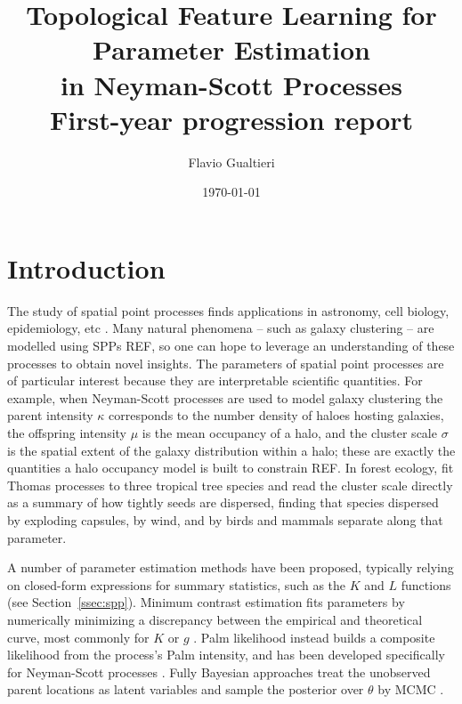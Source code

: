\documentclass[11pt,a4paper]{article}
\title{Topological Feature Learning for Parameter Estimation\\
       in Neyman-Scott Processes\\[4pt]
       \large First-year progression report}
\author{Flavio Gualtieri}
\date{\today}
\theoremstyle{definitioncolon}
\begin{document}
\maketitle



\section{Introduction}
\label{sec:intro}

The study of spatial point processes finds applications in astronomy, cell
biology, epidemiology, etc \citep{moller2004statistical}. Many natural phenomena
-- such as galaxy clustering -- are modelled using SPPs REF, so one can hope to
leverage an understanding of these processes to obtain novel insights. The
parameters of spatial point processes are of particular interest because
they are interpretable scientific quantities.
For example, when Neyman-Scott processes are used to model galaxy clustering the parent intensity $\kappa$ corresponds to the number density of
haloes hosting galaxies, the offspring intensity $\mu$ is the mean occupancy of
a halo, and the cluster scale $\sigma$ is the spatial extent of the galaxy
distribution within a halo; these are exactly the quantities a halo occupancy
model is built to constrain REF. In forest ecology,
\citet{waagepetersen2009twostep} fit Thomas processes to three tropical tree
species and read the cluster scale directly as a summary of how tightly seeds
are dispersed, finding that species dispersed by exploding capsules, by wind,
and by birds and mammals separate along that parameter.

A number of parameter estimation methods have been proposed,
typically relying on closed-form expressions for summary statistics, such as the $K$ and $L$
functions (see Section~\ref{ssec:spp}). Minimum contrast estimation fits
parameters by numerically
minimizing a discrepancy between the empirical and theoretical curve, most
commonly for $K$ or $g$ \citep{diggle2003spatial}. Palm likelihood instead
builds a composite likelihood from the process's Palm intensity, and has been
developed specifically for Neyman-Scott processes \citep{tanaka2008parameter}.
Fully Bayesian approaches treat the unobserved parent locations as latent
variables and sample the posterior over $\theta$ by MCMC
\citep{moller2004statistical}.
\end{document}
